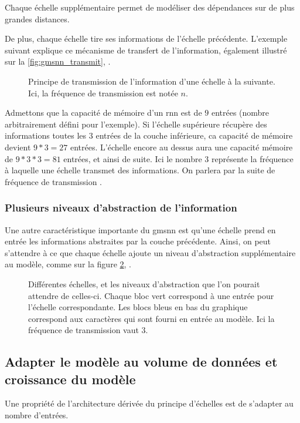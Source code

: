 {Chaque échelle supplémentaire permet de modéliser des dépendances sur de plus grandes distances.

De plus, chaque échelle tire ses informations de l'échelle précédente.
L'exemple suivant explique ce mécanisme de transfert de l'information, également illustré sur la \autoref{fig:gmsnn_transmit}, .

\begin{figure}[ht]
	\centering
	
	\caption[Principe de transmission de l'information d'une échelle à la suivante.]{Principe de transmission de l'information d'une échelle à la suivante. Ici, la fréquence de transmission est notée $n$.}
	\label{fig:gmsnn_transmit}
\end{figure}

Admettons que la capacité de mémoire d'un \gls{rnn} est de $9$ entrées (nombre arbitrairement défini pour l'exemple).
Si l'échelle supérieure récupère des informations toutes les $3$ entrées de la couche inférieure, ca capacité de mémoire devient $9*3=27$ entrées.
L'échelle encore au dessus aura une capacité mémoire de  $9*3*3=81$ entrées, et ainsi de suite.
Ici le nombre $3$ représente la fréquence à laquelle une échelle transmet des informations. On parlera par la suite de \og fréquence de transmission \fg{}.

\subsubsection{Plusieurs niveaux d'abstraction de l'information}
Une autre caractéristique importante du \gls{gmsnn} est qu'une échelle prend en entrée les informations abstraites par la couche précédente.
Ainsi, on peut s'attendre à ce que chaque échelle ajoute un niveau d'abstraction supplémentaire au modèle, comme sur la figure \ref{fig:gmsnn_ms}, .

\begin{figure}[ht]
	\centering
	
	\caption[Différentes échelles, et les niveaux d'abstraction correspondants.]{%
		Différentes échelles, et les niveaux d'abstraction que l'on pourait attendre de celles-ci.
		Chaque bloc vert correspond à une entrée pour l'échelle correspondante.
		Les blocs bleus en bas du graphique correspond aux caractères qui sont fourni en entrée au modèle.
		Ici la fréquence de transmission vaut 3.}
	\label{fig:gmsnn_ms}
\end{figure}

\subsection{Adapter le modèle au volume de données et croissance du modèle}
Une propriété de l'architecture dérivée du principe d'échelles est de s'adapter au nombre d'entrées.

}
